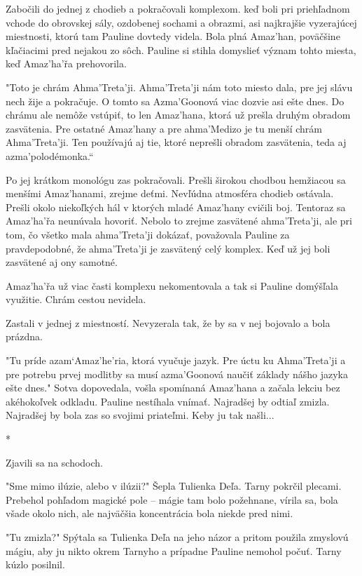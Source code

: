 \documentclass{book}
\begin{document}
Zabočili do jednej z chodieb a pokračovali komplexom. keď boli pri priehľadnom vchode do obrovskej sály, ozdobenej sochami a obrazmi, asi najkrajšie vyzerajúcej miestnosti, ktorú tam Pauline dovtedy videla. Bola plná Amaz'han, poväčšine kľačiacimi pred nejakou zo sôch. Pauline si stihla domyslieť význam tohto miesta, keď Amaz'ha'r\v{}a prehovorila.

"$ $Toto je chrám Ahma'Treta'ji. Ahma'Treta'ji nám toto miesto dala, pre jej slávu nech žije a pokračuje. O tomto sa Azma'Goonová viac dozvie asi ešte dnes. Do chrámu ale nemôže vstúpiť, to len Amaz'hana, ktorá už prešla druhým obradom zasvätenia. Pre ostatné Amaz'hany a pre ahma'Medizo je tu menší chrám Ahma'Treta'ji. Ten používajú aj tie, ktoré neprešli obradom zasvätenia, teda aj azma'polodémonka.“

Po jej krátkom monológu zas pokračovali. Prešli širokou chodbou hemžiacou sa menšími Amaz'hanami, zrejme deťmi. Nevľúdna atmosféra chodieb ostávala. Prešli okolo niekoľkých hál v ktorých mladé Amaz'hany cvičili boj. Tentoraz sa Amaz'ha'r\v{}a neunúvala hovoriť. Nebolo to zrejme zasvätené ahma'Treta'ji, ale pri tom, čo všetko mala ahma'Treta'ji dokázať, považovala Pauline za pravdepodobné, že ahma'Treta'ji je zasvätený celý komplex. Keď už jej boli zasvätené aj ony samotné.

Amaz'ha'r\v{}a už viac časti komplexu nekomentovala a tak si Pauline domýšľala využitie. Chrám cestou nevidela.

Zastali v jednej z miestností. Nevyzerala tak, že by sa v nej bojovalo a bola prázdna.

"$ $Tu príde azam‘Amaz'he'ria, ktorá vyučuje jazyk. Pre úctu ku Ahma'Treta'ji a pre potrebu prvej modlitby sa musí azma'Goonová naučiť základy nášho jazyka ešte dnes."$ $ Sotva dopovedala, vošla spomínaná Amaz'hana a začala lekciu bez akéhokoľvek odkladu. Pauline nestíhala vnímať. Najradšej by odtiaľ zmizla. Najradšej by bola zas so svojimi priateľmi. Keby ju tak našli...

\begin{center}
*
\end{center}

Zjavili sa na schodoch.

"$ $Sme mimo ilúzie, alebo v ilúzii?"$ $ Šepla Tulienka Deľa. Tarny pokrčil plecami. Prebehol pohľadom magické pole – mágie tam bolo požehnane, vírila sa, bola všade okolo nich, ale najväčšia koncentrácia bola niekde pred nimi.

"$ $Tu zmizla?"$ $ Spýtala sa Tulienka Deľa na jeho názor a pritom použila zmyslovú mágiu, aby ju nikto okrem Tarnyho a prípadne Pauline nemohol počuť. Tarny kúzlo posilnil.
\end{document}
